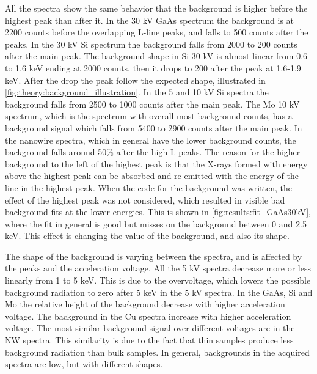 All the spectra show the same behavior that the background is higher before the highest peak than after it.
In the 30 kV GaAs spectrum the background is at 2200 counts before the overlapping L-line peaks, and falls to 500 counts after the peaks.
In the 30 kV Si spectrum the background falls from 2000 to 200 counts after the main peak.
The background shape in Si 30 kV is almost linear from 0.6 to 1.6 keV ending at 2000 counts, then it drops to 200 after the peak at 1.6-1.9 keV.
After the drop the peak follow the expected shape, illustrated in \cref{fig:theory:background_illustration}.
In the 5 and 10 kV Si spectra the background falls from 2500 to 1000 counts after the main peak.
The Mo 10 kV spectrum, which is the spectrum with overall most background counts, has a background signal which falls from 5400 to 2900 counts after the main peak.
In the nanowire spectra, which in general have the lower background counts, the background falls around 50\% after the high L-peaks.
The reason for the higher background to the left of the highest peak is that the X-rays formed with energy above the highest peak can be absorbed and re-emitted with the energy of the line in the highest peak.
When the code for the background was written, the effect of the highest peak was not considered, which resulted in visible bad background fits at the lower energies.
This is shown in \cref{fig:results:fit_GaAs30kV}, where the fit in general is good but misses on the background between 0 and 2.5 keV.
This effect is changing the value of the background, and also its shape.


The shape of the background is varying between the spectra, and is affected by the peaks and the acceleration voltage.
All the 5 kV spectra decrease more or less linearly from 1 to 5 keV.
This is due to the overvoltage, which lowers the possible background radiation to zero after 5 keV in the 5 kV spectra.
In the GaAs, Si and Mo the relative height of the background decrease with higher acceleration voltage.
The background in the Cu spectra increase with higher acceleration voltage.
The most similar background signal over different voltages are in the NW spectra. %
This similarity is due to the fact that thin samples produce less background radiation than bulk samples.
In general, backgrounds in the acquired spectra are low, but with different shapes.



